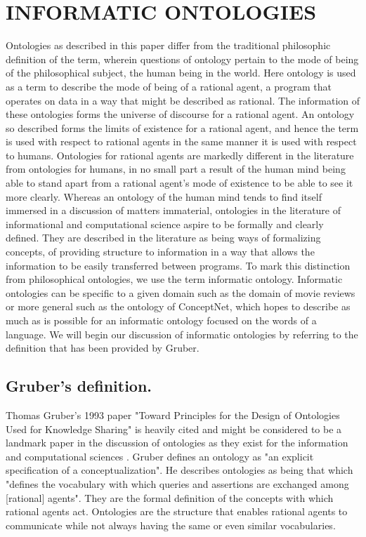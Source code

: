 \documentclass[letterpaper, 10 pt, conference]{ieeeconf}
\begin{document}
\section{INFORMATIC ONTOLOGIES}
Ontologies as described in this paper differ from the traditional philosophic definition of the term, wherein questions of ontology pertain to the mode of being of the philosophical subject, the human being in the world. Here ontology is used as a term to describe the mode of being of a rational agent, a program that operates on data in a way that might be described as rational. The information of these ontologies forms the universe of discourse for a rational agent. An ontology so described forms the limits of existence for a rational agent, and hence the term is used with respect to rational agents in the same manner it is used with respect to humans. Ontologies for rational agents are markedly different in the literature from ontologies for humans, in no small part a result of the human mind being able to stand apart from a rational agent's mode of existence to be able to see it more clearly. Whereas an ontology of the human mind tends to find itself immersed in a discussion of matters immaterial, ontologies in the literature of informational and computational science aspire to be formally and clearly defined. They are described in the literature as being ways of formalizing concepts, of providing structure to information in a way that allows the information to be easily transferred between programs. To mark this distinction from philosophical ontologies, we use the term informatic ontology. Informatic ontologies can be specific to a given domain such as the domain of movie reviews or more general such as the ontology of ConceptNet, which hopes to describe as much as is possible for an informatic ontology focused on the words of a language. We will begin our discussion of informatic ontologies by referring to the definition that has been provided by Gruber.

\subsection{Gruber's definition.}
Thomas Gruber's 1993 paper "Toward Principles for the Design of Ontologies Used for Knowledge Sharing" is heavily cited and might be considered to be a landmark paper in the discussion of ontologies as they exist for the information and computational sciences \textcolor{gray}{\cite{Gruber}}. Gruber defines an ontology as "an explicit specification of a conceptualization". He describes ontologies as being that which "defines the vocabulary with which queries and assertions are exchanged among [rational] agents". They are the formal definition of the concepts with which rational agents act. Ontologies are the structure that enables rational agents to communicate while not always having the same or even similar vocabularies.
\end{document}
